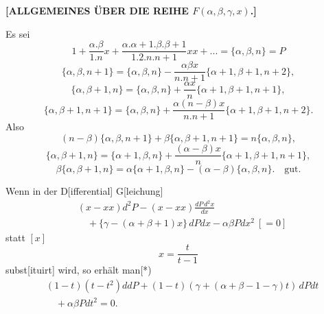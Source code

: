 \begingroup
\makeatletter\tagsleft@true\let\veqno\@@leqno\makeatother
\clearpage\NoSourceHead{}
\begin{center}\large\bfseries [ALLGEMEINES ÜBER DIE REIHE $F(\alpha,\beta,\gamma,x)$.]\end{center}
\noindent{\small[S. 234]}\par
\par\indent Es sei
\[1+\frac{\alpha{.}\beta}{1{.}n}x+\frac{\alpha{.}\alpha+1{.}\beta{.}\beta+1}{1{.}2{.}n{.}n+1}xx+{.}{.}{.}=\{\alpha,\beta,n\}=P\]
\begin{equation}
\{\alpha,\beta,n+1\}=\{\alpha,\beta,n\}-\frac{\alpha\beta x}{n{.}n+1}\{\alpha+1,\beta+1,n+2\},\tag*{1)}
\end{equation}
\begin{equation}
\{\alpha,\beta+1,n\}=\{\alpha,\beta,n\}+\frac{\alpha x}{n}\{\alpha+1,\beta+1,n+1\},\tag*{2)}
\end{equation}
\begin{equation}
\{\alpha,\beta+1,n+1\}=\{\alpha,\beta,n\}+\frac{\alpha(n-\beta)x}{n{.}n+1}\{\alpha+1,\beta+1,n+2\}.\tag*{3)}
\end{equation}
\noindent Also
\begin{equation}
(n-\beta)\{\alpha,\beta,n+1\}+\beta\{\alpha,\beta+1,n+1\}=n\{\alpha,\beta,n\},\tag*{4)}
\end{equation}
\begin{equation}
\{\alpha,\beta+1,n\}=\{\alpha+1,\beta,n\}+\frac{(\alpha-\beta)x}{n}\{\alpha+1,\beta+1,n+1\},\tag*{5)}
\end{equation}
\begin{equation}
\beta\{\alpha,\beta+1,n\}=\alpha\{\alpha+1,\beta,n\}-(\alpha-\beta)\{\alpha,\beta,n\}.\quad\text{gut.}\tag*{6)}
\end{equation}
\par\indent Wenn in der D[ifferential] G[leichung]
\[\begin{aligned}
&(x-xx)d^2P-(x-xx)\frac{dP\,d^2x}{dx}\\[.6em]
&\quad+\{\gamma-(\alpha+\beta+1)x\}\,dPdx-\alpha\beta Pdx^2\ [=0]
\end{aligned}\]
\noindent statt $[x]$
\clearpage{}
\[x=\frac{t}{t-1}\]
\noindent subst[ituirt] wird, so erhält man[*)
\[\begin{aligned}
&(1-t)(t-t^2)ddP+(1-t)(\gamma+(\alpha+\beta-1-\gamma)t)\,dPdt\\[.4em]
&\quad+\alpha\beta Pdt^2=0.
\end{aligned}\]
